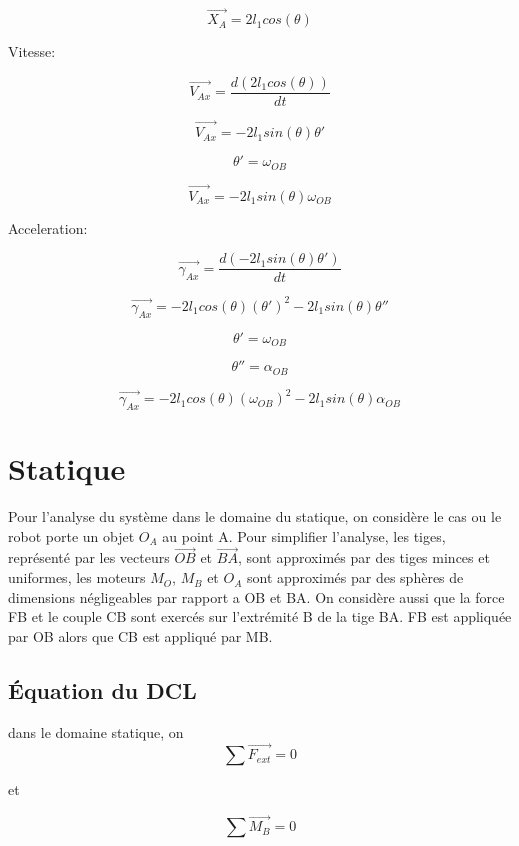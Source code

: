 \documentclass{article}
\begin{document}
\begin{equation}
\overrightarrow{X_A} = 2l_1cos(\theta)
\end{equation}

\noindent Vitesse:

\begin{equation}
\overrightarrow{V_{Ax}} = \frac{d(2l_1cos(\theta))}{dt}
\end{equation}

\begin{equation}
\overrightarrow{V_{Ax}} = -2l_1sin(\theta)\theta'
\end{equation}

\begin{equation}
\theta' = \omega_{OB}
\end{equation}

\begin{equation}
\overrightarrow{V_{Ax}} = -2l_1sin(\theta)\omega_{OB}
\end{equation}

\noindent Acceleration:

\begin{equation}
\overrightarrow{\gamma_{Ax}} = \frac{d(-2l_1sin(\theta)\theta')}{dt}
\end{equation}

\begin{equation}
\overrightarrow{\gamma_{Ax}} = -2l_1cos(\theta)(\theta')^2-2l_1sin(\theta)\theta''
\end{equation}

\begin{equation}
\theta' = \omega_{OB}
\end{equation}

\begin{equation}
\theta'' = \alpha_{OB}
\end{equation}

\begin{equation}
\overrightarrow{\gamma_{Ax}} = -2l_1cos(\theta)(\omega_{OB})^2-2l_1sin(\theta)\alpha_{OB}
\end{equation}

\section{Statique}
Pour l'analyse du système dans le domaine du statique, on considère le cas ou le robot porte un objet $O_A$ au point A. Pour simplifier l'analyse, les tiges, représenté par les vecteurs $\overrightarrow{OB}$ et $\overrightarrow{BA}$, sont approximés par des tiges minces et uniformes, les moteurs $M_O$, $M_B$ et $O_A$ sont approximés par des sphères de dimensions négligeables par rapport a OB et BA. On considère aussi que la force FB et le couple CB sont exercés sur l’extrémité B de la tige BA. FB est appliquée par OB alors que CB est appliqué par MB.
\subsection{Équation du DCL}
dans le domaine statique, on
\begin{equation}
\sum \overrightarrow{F_{ext}} = 0
\end{equation}
\begin{center} 
et 
\end{center}

\begin{equation}
\sum \overrightarrow{M_B} = 0
\end{equation}
\end{document}
